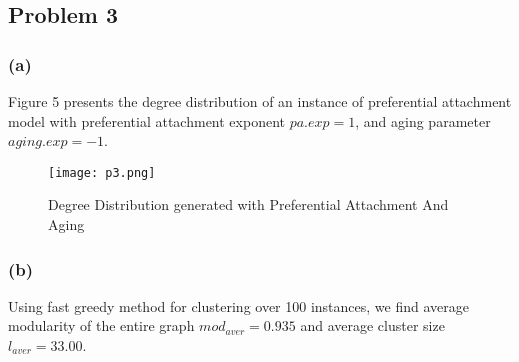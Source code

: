 \subsection*{Problem 3}
\subsubsection*{(a)}
Figure 5 presents the degree distribution of an instance of preferential attachment model with preferential attachment exponent $pa.exp = 1$, and aging parameter $aging.exp = -1$. 
\begin{figure} [h]
	\centering
	\texttt{[image: p3.png]}
	\caption{Degree Distribution generated with Preferential Attachment And Aging}
\end{figure}
\subsubsection*{(b)}
Using fast greedy method for clustering over 100 instances, we find average modularity of the entire graph $ mod_{aver} = 0.935$ and average cluster size $l_{aver} = 33.00$.